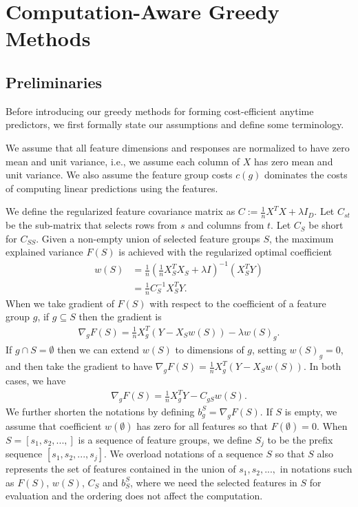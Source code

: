 \section{Computation-Aware Greedy Methods}
\label{sec:gomp_method}


\subsection{Preliminaries}
Before introducing our greedy methods for forming cost-efficient anytime predictors, 
we first formally state our assumptions and define some terminology.

We assume that all feature dimensions and responses are normalized to 
have zero mean and unit variance, i.e., we assume each column of $X$ has zero mean and unit variance.
We also assume the feature group costs $c(g)$ dominates the costs of computing linear predictions 
using the features.

We define the regularized feature covariance matrix as 
$C := \frac{1}{n}X^TX + \lambda I_D$. 
Let $C_{st}$ be the sub-matrix that selects rows from $s$ and columns from $t$. Let $C_S$ be short for $C_{SS}$. 
Given a non-empty union of selected feature groups $S$, the maximum explained variance 
$F(S)$ is achieved with the regularized optimal 
coefficient 
\begin{align}
w(S) 
&= \frac{1}{n}(\frac{1}{n}X_S^TX_S + \lambda I)^{-1}(X_S^TY) \\
&= \frac{1}{n} C_S^{-1}X_S^TY.
\label{eq:gomp_w}
\end{align}
When we take gradient of $F(S)$ with respect to the coefficient 
of a feature group $g$, if $g \subseteq S$ then the gradient is
\begin{align}
\nabla_g F(S) = \frac{1}{n} X_g^T(Y-X_Sw(S)) - \lambda w(S)_g.
\label{eq:gomp_g}
\end{align}
If $g \cap S  =\emptyset$ then we can extend $w(S)$ to dimensions of $g$, setting $w(S)_g = 0$, and then take the gradient to have 
\mbox{$\nabla_g F(S) =\frac{1}{n} X_g^T(Y-X_Sw(S))$}. In both cases,
we have 
\begin{align}
\nabla_g F(S) = \frac{1}{n} X_g^TY - C_{gS}w(S).
\label{eq:gomp_g}
\end{align} 
We further shorten the notations by defining $b_g^{S} = \nabla _g F(S)$. 
If $S$ is empty, we assume that coefficient $w(\emptyset)$ has zero for all features so that $F(\emptyset) = 0$. 
When $S = [s_1, s_2,...,]$ is a sequence of feature groups, we define
$S_j$ to be the prefix sequence $[s_1, s_2,..., s_j]$. We 
overload notations of a sequence $S$ so that $S$ also represents 
the set of features contained in the union of $s_1, s_2, ...,$ in notations such as $F(S)$, $w(S)$, $C_S$ and $b_S^S$, 
where we need the selected features in $S$ for evaluation and the ordering does not affect the computation.

